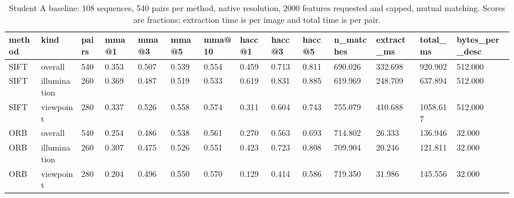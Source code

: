 \begin{table}[htbp]
\centering
\small
\caption{Student A baseline: 108 sequences, 540 pairs per method, native resolution, 2000 features requested and capped, mutual matching. Scores are fractions; extraction time is per image and total time is per pair.}
\label{tab:m1_baseline}
\begin{tabular}{@{}llllllllllllll@{}}
\toprule
method & kind & pairs & mma@1 & mma@3 & mma@5 & mma@10 & hacc@1 & hacc@3 & hacc@5 & n\_matches & extract\_ms & total\_ms & bytes\_per\_desc \\
\midrule
SIFT & overall & 540 & 0.353 & 0.507 & 0.539 & 0.554 & 0.459 & 0.713 & 0.811 & 690.026 & 332.698 & 920.902 & 512.000 \\
SIFT & illumination & 260 & 0.369 & 0.487 & 0.519 & 0.533 & 0.619 & 0.831 & 0.885 & 619.969 & 248.709 & 637.894 & 512.000 \\
SIFT & viewpoint & 280 & 0.337 & 0.526 & 0.558 & 0.574 & 0.311 & 0.604 & 0.743 & 755.079 & 410.688 & 1058.617 & 512.000 \\
ORB & overall & 540 & 0.254 & 0.486 & 0.538 & 0.561 & 0.270 & 0.563 & 0.693 & 714.802 & 26.333 & 136.946 & 32.000 \\
ORB & illumination & 260 & 0.307 & 0.475 & 0.526 & 0.551 & 0.423 & 0.723 & 0.808 & 709.904 & 20.246 & 121.811 & 32.000 \\
ORB & viewpoint & 280 & 0.204 & 0.496 & 0.550 & 0.570 & 0.129 & 0.414 & 0.586 & 719.350 & 31.986 & 145.556 & 32.000 \\
\bottomrule
\end{tabular}
\end{table}
